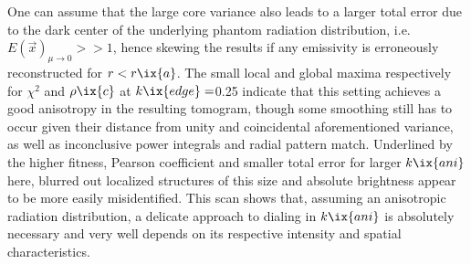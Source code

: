                 One can assume that the large core variance also leads to a larger total error due to the dark center of the underlying phantom radiation distribution, i.e. $E\left(\vec{x}\right)_{\mu\rightarrow0}>>1$, hence skewing the results if any emissivity is erroneously reconstructed for $r<r\ix{a}$. The small local and global maxima respectively for $\chi^{2}$ and $\rho\ix{c}$ at $k\ix{edge}=$\SI{0.25}{\arbitraryunit} indicate that this setting achieves a good anisotropy in the resulting tomogram, though some smoothing still has to occur given their distance from unity and coincidental aforementioned variance, as well as inconclusive power integrals and radial pattern match. Underlined by the higher fitness, Pearson coefficient and smaller total error for larger $k\ix{ani}$ here, blurred out localized structures of this size and absolute brightness appear to be more easily misidentified. This scan shows that, assuming an anisotropic radiation distribution, a delicate approach to dialing in $k\ix{ani}$ is absolutely necessary and very well depends on its respective intensity and spatial characteristics.%
%
